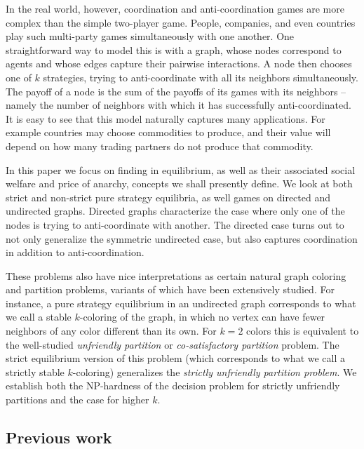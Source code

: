 \documentclass{llncs}
\begin{document}
In the real world, however, coordination and anti-coordination games are more
complex than the simple two-player game.  People, companies, and even countries play
such multi-party games simultaneously with one another. One straightforward way 
to model this is with a graph, whose nodes correspond
to agents and whose edges capture their pairwise interactions.  A node then
chooses one of $k$ strategies, 
trying to anti-coordinate with all its neighbors simultaneously.  The payoff of
a node is the sum of the payoffs of its games with its neighbors -- namely
the number of neighbors with which it has successfully anti-coordinated.  It is
easy to see that this model naturally captures many applications.  For example
countries may choose commodities to produce, and their value will depend on
how many trading partners do not produce that commodity.

In this paper we focus on finding  in equilibrium,
as well as their associated social welfare and price of anarchy, concepts we
shall presently define.  We look at both strict and non-strict  pure strategy
equilibria, as well games on directed and undirected graphs.  Directed graphs
characterize the case where only one of the nodes is trying to anti-coordinate
with another.  The directed case turns out to not only generalize the symmetric
undirected case, but also captures coordination in addition to
anti-coordination.

These problems also have nice interpretations as certain natural graph coloring
and partition problems, variants of which have been extensively studied.  For
instance, a pure strategy equilibrium in an undirected graph corresponds to
what we call a stable $k$-coloring of the graph, in which no vertex can have fewer
neighbors of any color different than its own.  For $k=2$ colors this is equivalent
to the well-studied \emph{unfriendly partition} or \emph{co-satisfactory
partition} problem.  The strict equilibrium version of this problem (which
corresponds to what we call a strictly stable $k$-coloring) generalizes the
\emph{strictly unfriendly partition problem}. We establish both the NP-hardness 
of the decision problem for strictly unfriendly partitions and the case for higher $k$.


\subsection{Previous work}

\end{document}

